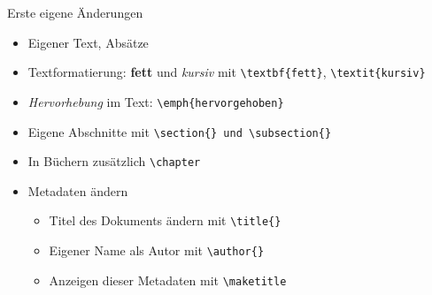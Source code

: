 \documentclass[presentation,aspectratio=169]{beamer}
\begin{document}
\begin{frame}[fragile]{Erste eigene Änderungen}
  \begin{itemize}
    \item Eigener Text, Absätze
    \item Textformatierung: \textbf{fett} und \textit{kursiv} mit \verb|\textbf{fett}|, \verb|\textit{kursiv}|
    \item \emph{Hervorhebung} im Text: \verb|\emph{hervorgehoben}|
    \item Eigene Abschnitte mit \verb|\section{} und \subsection{}|
    \item In Büchern zusätzlich \verb|\chapter|
    \item Metadaten ändern
      \begin{itemize}
        \item Titel des Dokuments ändern mit \verb|\title{}|
        \item Eigener Name als Autor mit \verb|\author{}|
        \item Anzeigen dieser Metadaten mit \verb|\maketitle|
      \end{itemize}
  \end{itemize}
\end{frame}

\maketitle
\end{document}
